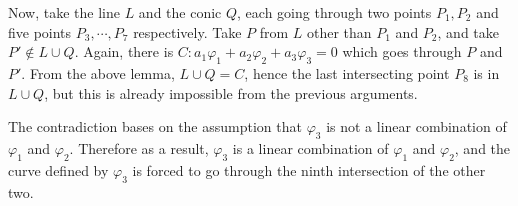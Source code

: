 \documentclass{article}
\begin{document}
Now, take the line $L$ and the conic $Q$, each going through two points $P_1, P_2$ and five points $P_3, \cdots, P_7$ respectively. Take $P$ from $L$ other than $P_1$ and $P_2$, and take $P' \notin L \cup Q$. Again, there is $C : a_1 \varphi_1 + a_2 \varphi_2 + a_3 \varphi_3 = 0$ which goes through $P$ and $P'$. From the above lemma, $L \cup Q = C$, hence the last intersecting point $P_8$ is in $L \cup Q$, but this is already impossible from the previous arguments.

The contradiction bases on the assumption that $\varphi_3$ is not a linear combination of $\varphi_1$ and $\varphi_2$. Therefore as a result, $\varphi_3$ is a linear combination of $\varphi_1$ and $\varphi_2$, and the curve defined by $\varphi_3$ is forced to go through the ninth intersection of the other two.
\end{document}
